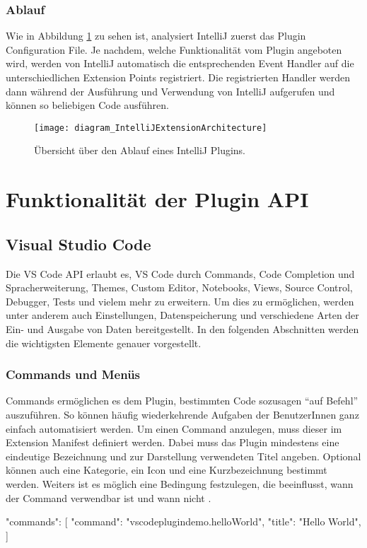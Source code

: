 \subsubsection{Ablauf}
  Wie in Abbildung \ref{fig:diagram_IntelliJExtensionArchitecture} zu sehen ist,
  analysiert IntelliJ zuerst das Plugin Configuration File.
  Je nachdem, welche Funktionalität vom Plugin angeboten wird, werden
  von IntelliJ automatisch die entsprechenden Event Handler 
  auf die unterschiedlichen Extension Points registriert. 
  Die registrierten Handler werden dann während der Ausführung und Verwendung
  von IntelliJ aufgerufen und können so beliebigen Code ausführen.
  \begin{figure}
    \centering
    \texttt{[image: diagram\_IntelliJExtensionArchitecture]}
    \caption{Übersicht über den Ablauf eines IntelliJ Plugins.}
    \label{fig:diagram_IntelliJExtensionArchitecture}
  \end{figure}   

\section{Funktionalität der Plugin API}
\label{sec:FunktionalitätDerPluginAPI}

\subsection{Visual Studio Code}

Die VS Code API erlaubt es, VS Code durch Commands, Code Completion und Spracherweiterung, 
Themes, Custom Editor, Notebooks, Views, Source Control, Debugger, Tests und vielem mehr zu
erweitern. Um dies zu ermöglichen, werden unter anderem auch Einstellungen, Datenspeicherung
und verschiedene Arten der Ein- und Ausgabe von Daten bereitgestellt. In den folgenden Abschnitten
werden die wichtigsten Elemente genauer vorgestellt.

\subsubsection{Commands und Menüs}
  Commands ermöglichen es dem Plugin, bestimmten Code sozusagen \enquote{auf Befehl} auszuführen.
  So können häufig wiederkehrende Aufgaben der BenutzerInnen ganz einfach automatisiert werden.
  Um einen Command anzulegen, muss dieser im Extension Manifest definiert werden. Dabei muss
  das Plugin mindestens eine eindeutige Bezeichnung und zur Darstellung verwendeten Titel angeben.
  Optional können auch eine Kategorie, ein Icon und eine Kurzbezeichnung bestimmt werden. 
  Weiters ist es möglich eine Bedingung festzulegen, die beeinflusst, wann
  der Command verwendbar ist und wann nicht \cite{VSCodeExtensionAPIContributionPointsCommands}.
\begin{JsCode}
    "commands": [
      {
        "command": "vscodeplugindemo.helloWorld",
        "title": "Hello World",
      }
    ] 
\end{JsCode}


